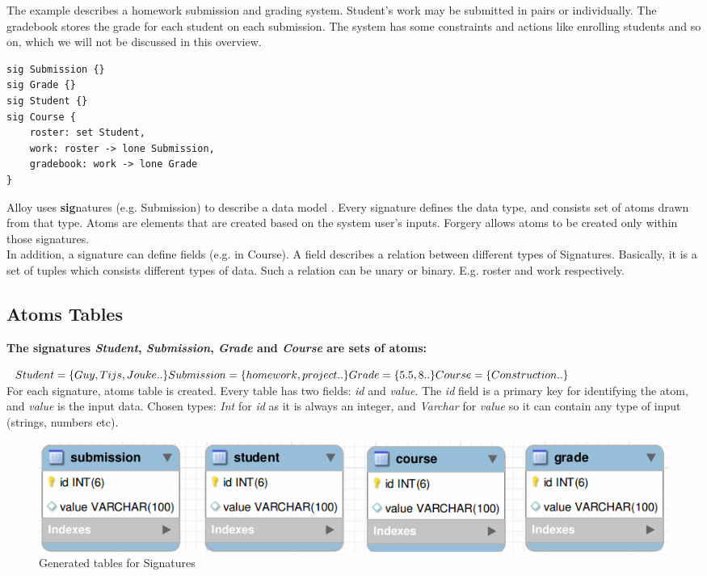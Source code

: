 \documentclass[oneside]{book}
\begin{document}
\noindent The example describes a homework submission and grading system. Student's work may be submitted in pairs or individually. The gradebook stores the grade for each student on each submission. The system has some constraints and actions like enrolling students and so on, which we will not be discussed in this overview.\\
\begin{lstlisting}
sig Submission {}
sig Grade {}
sig Student {}
sig Course {
	roster: set Student,
	work: roster -> lone Submission,
	gradebook: work -> lone Grade
}
\end{lstlisting}

\noindent Alloy uses \textbf{sig}natures (e.g. Submission) to describe a data model \cite[p.~30]{alloy-manual}. Every signature defines the data type, and consists set of atoms drawn from that type. Atoms are elements that are created based on the system user's inputs. Forgery allows atoms to be created only within those signatures. \\

\noindent In addition, a signature can define fields (e.g. in Course). A field describes a relation between different types of Signatures. Basically, it is a set of tuples which consists different types of data. Such a relation can be unary or binary. E.g. roster and work respectively.

\newpage
\subsection{Atoms Tables}
\textbf{The signatures \textit{Student}, \textit{Submission}, \textit{Grade} and \textit{Course} are sets of atoms:}

\noindent$Student = \{Guy, Tijs, Jouke ..\}\\
Submission = \{homework, project ..\}\\
Grade = \{5.5, 8 ..\} \\
Course = \{Construction ..\}$\\

\noindent For each signature, atoms table is created. Every table has two fields: \textit{id} and \textit{value}.
The \textit{id} field is a primary key for identifying the atom, and \textit{value} is the input data.
Chosen types: \textit{Int} for \textit{id} as it is always an integer, and \textit{Varchar} for \textit{value} so it can contain any type of input (strings, numbers etc).

\begin{figure}[h!]
\centering
\includegraphics[scale=0.5]{1}
\caption{Generated tables for Signatures}
\end{figure}
\end{document}
